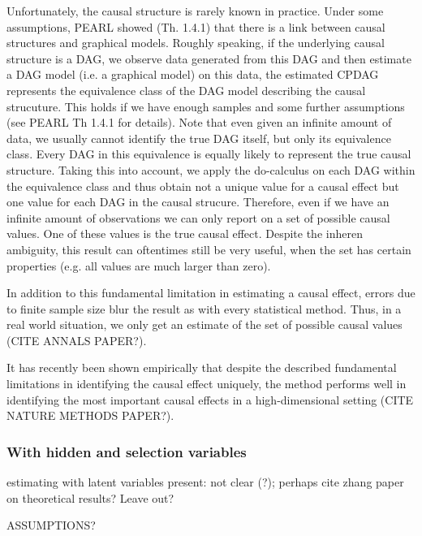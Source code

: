 \documentclass[article]{jss}
\begin{document}
Unfortunately, the causal structure is rarely known in practice. Under some
assumptions, PEARL showed (Th. 1.4.1) that there is a link between causal
structures and graphical models. Roughly speaking, if the underlying causal
structure is a DAG, we observe data generated from this DAG and then
estimate a DAG model (i.e. a graphical model) on this data, the estimated
CPDAG represents the equivalence class of the DAG model describing the
causal strucuture. This holds if we have enough samples and some further
assumptions (see PEARL Th 1.4.1 for details). Note that even given an
infinite amount of data, we usually cannot identify the true DAG itself,
but only its equivalence class. Every DAG in this equivalence is equally
likely to represent the true causal structure. Taking this into account, we
apply the do-calculus on each DAG within the equivalence class and thus
obtain not a unique value for a causal effect but one value for each DAG in
the causal strucure. Therefore, even if we have an infinite amount of
observations we can only report on a set of possible causal values. One of
these values is the true causal effect. Despite the inheren ambiguity, this
result can oftentimes still be very
useful, when the set has certain properties (e.g. all values are much
larger than zero).

In addition to this fundamental limitation in estimating a causal effect,
errors due to finite sample size blur the result as with every statistical
method. Thus, in a real world situation, we only get an estimate of the set
of possible causal values (CITE ANNALS PAPER?). 

It has recently been shown empirically that despite the described
fundamental limitations in identifying the causal effect uniquely, the
method performs well in identifying the most important causal effects in a
high-dimensional setting (CITE NATURE METHODS PAPER?).

\subsubsection{With hidden and selection variables}
estimating with latent variables present: not clear (?); perhaps cite
zhang paper on theoretical results? Leave out?

ASSUMPTIONS?
\end{document}

